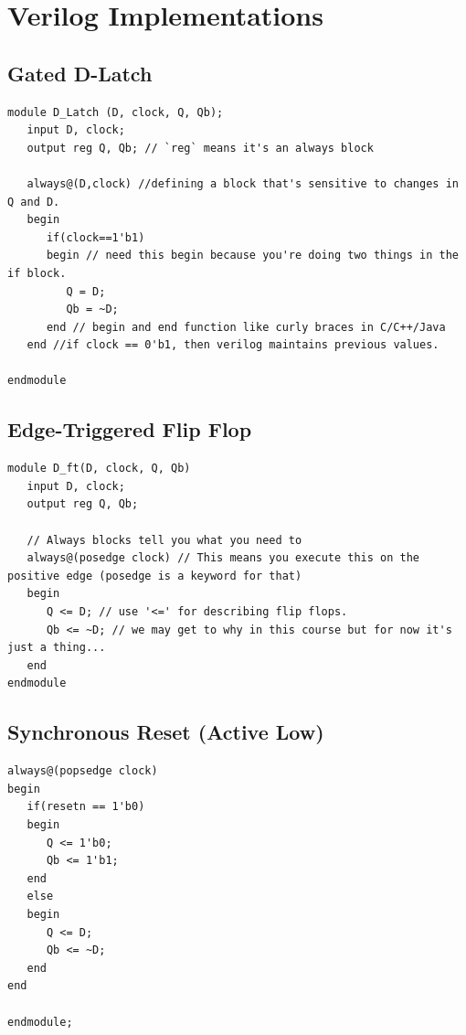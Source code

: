 \documentclass[a4paper,12pt]{report}
\begin{document}

\section{Verilog Implementations}
\subsection{Gated D-Latch}
\begin{lstlisting}
module D_Latch (D, clock, Q, Qb);   
   input D, clock;
   output reg Q, Qb; // `reg` means it's an always block

   always@(D,clock) //defining a block that's sensitive to changes in Q and D.
   begin
      if(clock==1'b1)
      begin // need this begin because you're doing two things in the if block.
         Q = D;
         Qb = ~D;
      end // begin and end function like curly braces in C/C++/Java
   end //if clock == 0'b1, then verilog maintains previous values. 

endmodule
\end{lstlisting}

\subsection{Edge-Triggered Flip Flop}
\begin{lstlisting}
module D_ft(D, clock, Q, Qb)
   input D, clock;
   output reg Q, Qb;

   // Always blocks tell you what you need to 
   always@(posedge clock) // This means you execute this on the positive edge (posedge is a keyword for that)
   begin 
      Q <= D; // use '<=' for describing flip flops.
      Qb <= ~D; // we may get to why in this course but for now it's just a thing...
   end
endmodule
\end{lstlisting}

\subsection{Synchronous Reset (Active Low)}
\begin{lstlisting}
always@(popsedge clock)
begin
   if(resetn == 1'b0)
   begin
      Q <= 1'b0;
      Qb <= 1'b1;
   end
   else 
   begin
      Q <= D;
      Qb <= ~D;
   end
end 

endmodule;

\end{lstlisting}
\end{document}

